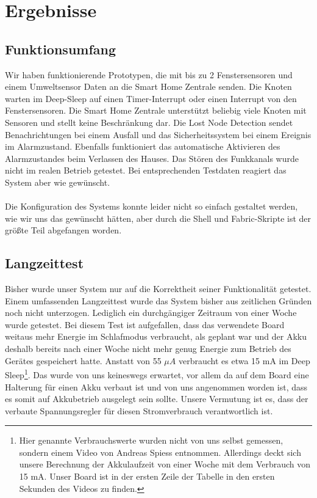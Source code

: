 \documentclass[a4paper,10pt,twocolumn]{article}
\begin{document}
\section{Ergebnisse}

\subsection{Funktionsumfang}
Wir haben funktionierende Prototypen, die mit bis zu 2 Fenstersensoren und einem Umweltsensor Daten an die Smart Home Zentrale senden. Die Knoten warten im Deep-Sleep auf einen Timer-Interrupt oder einen Interrupt von den Fenstersensoren. Die Smart Home Zentrale unterstützt beliebig viele Knoten mit Sensoren und stellt keine Beschränkung dar. Die Lost Node Detection sendet Benachrichtungen bei einem Ausfall und das Sicherheitssystem bei einem Ereignis im Alarmzustand. Ebenfalls funktioniert das automatische Aktivieren des Alarmzustandes beim Verlassen des Hauses. Das Stören des Funkkanals wurde nicht im realen Betrieb getestet. Bei entsprechenden Testdaten reagiert das System aber wie gewünscht.\\\\
Die Konfiguration des Systems konnte leider nicht so einfach gestaltet werden, wie wir uns das gewünscht hätten, aber durch die Shell und Fabric-Skripte ist der größte Teil abgefangen worden.\\

\subsection{Langzeittest}
Bisher wurde unser System nur auf die Korrektheit seiner Funktionalität getestet. Einem umfassenden Langzeittest wurde das System bisher aus zeitlichen Gründen noch nicht unterzogen. Lediglich ein durchgängiger Zeitraum von einer Woche wurde getestet. Bei diesem Test ist aufgefallen, dass das verwendete Board weitaus mehr Energie im Schlafmodus verbraucht, als geplant war und der Akku deshalb bereits nach einer Woche nicht mehr genug Energie zum Betrieb des Gerätes gespeichert hatte. Anstatt von 55 $\mu A$ verbraucht es etwa 15 mA im Deep Sleep\footnote{Hier genannte Verbrauchswerte wurden nicht von uns selbst gemessen, sondern einem Video von Andreas Spiess\cite{andreasSpiess} entnommen. Allerdings deckt sich unsere Berechnung der Akkulaufzeit von einer Woche mit dem Verbrauch von 15 mA. Unser Board ist in der ersten Zeile der Tabelle in den ersten Sekunden des Videos zu finden.}. Das wurde von uns keineswegs erwartet, vor allem da auf dem Board eine Halterung für einen Akku verbaut ist und von uns angenommen worden ist, dass es somit auf Akkubetrieb ausgelegt sein sollte. Unsere Vermutung ist es, dass der verbaute Spannungsregler für diesen Stromverbrauch verantwortlich ist.
\end{document}
